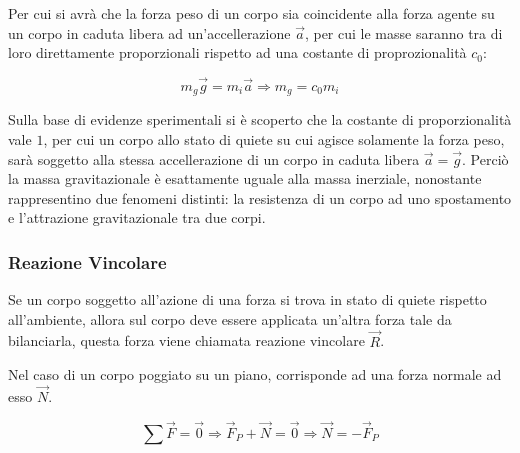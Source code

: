 \documentclass{article}
\numberwithin{equation}{subsection}
\begin{document}
Per cui si avrà che la forza peso di un corpo sia coincidente alla forza agente su un corpo in caduta libera ad un'accellerazione $\vec{a}$, 
per cui le masse saranno tra di loro direttamente proporzionali rispetto ad una costante di proprozionalità $c_0$:

\begin{equation*}
    m_g\vec{g}=m_i\vec{a}\Rightarrow m_g=c_0m_i
\end{equation*}

Sulla base di evidenze sperimentali si è scoperto che la costante di proporzionalità vale $1$, per cui un corpo allo stato di quiete su cui agisce 
solamente la forza peso, sarà soggetto alla stessa accellerazione di un corpo in caduta libera $\vec{a}=\vec{g}$. Perciò la massa gravitazionale è 
esattamente uguale alla massa inerziale, nonostante rappresentino due fenomeni distinti: la resistenza di un corpo ad uno spostamento e 
l'attrazione gravitazionale tra due corpi.

\subsubsection{Reazione Vincolare}

Se un corpo soggetto all'azione di una forza si trova in stato di quiete rispetto all'ambiente, allora sul corpo deve essere applicata un'altra forza tale da bilanciarla, 
questa forza viene chiamata reazione vincolare $\vec{R}$. 

Nel caso di un corpo poggiato su un piano, corrisponde ad una forza normale ad esso $\vec{N}$. 

\begin{equation}
    \displaystyle\sum\vec{F}=\vec{0}\Rightarrow\vec{F}_P+\vec{N}=\vec{0}\Rightarrow\vec{N}=-\vec{F}_P
\end{equation}

\begin{center}\end{center}
    
\end{document}
